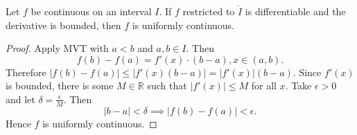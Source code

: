 \documentclass[../notes.tex]{subfiles}
\begin{document}
\begin{theorem}
    Let $f$ be continuous on an interval $I$. If $f$ restricted to $\mathring{I}$ is differentiable and the derivative is bounded, then $f$ is uniformly continuous.
\end{theorem}

\begin{proof}
    Apply MVT with $a < b$ and $a,b \in I$. Then
    \[
        f(b) - f(a) = f'(x) \cdot (b-a), x \in (a,b)
    .\]
    Therefore $|f(b) - f(a)| \leq |f'(x) (b-a)| = |f'(x)| (b-a)$. Since $f'(x)$ is bounded, there is some $M \in \mathbb{R}$ such that $|f'(x)| \leq M$ for all $x$. Take $\epsilon > 0$ and let $\delta = \frac{\epsilon}{M}$. Then
    \[
        |b - a| < \delta \implies |f(b) - f(a)| < \epsilon
    .\]
    Hence $f$ is uniformly continuous.
\end{proof}
\end{document}
